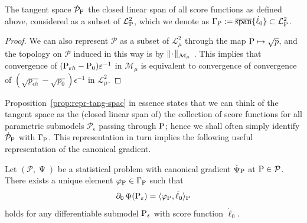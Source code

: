 \documentclass[a4,danish]{article}
\DeclareMathOperator{\TT}{\Psi}
\newcommand{\lp}{\mathcal{L}_{\P}^2} %
\begin{document}
\begin{proposition}
  \label{prop:repr-tang-spac}
  The tangent space $\dot{\mathcal{P}}_{\P}$  the closed linear span of all score functions as defined above, considered as a
  subset of $\lp$, which we denote as
  $\Gamma_{\P} := \overline{\mathrm{span}}\{\dot{\ell}_0\} \subset \lp$.
\end{proposition}

\begin{proof}
   We can also
  represent $\mathcal{P}$ as a subset of $\mathcal{L}_{\mu}^2$ through the map
  $\P \mapsto \sqrt{p}$, and the topology on $\mathcal{P}$ induced in this way is  by
  $\Vert \blank \Vert_{\mathcal{M}_{\mu}}$ \citep{bickel1993efficient}. This implies that
  convergence of $(\P_{\epsilon h} - \P_{0})\epsilon^{-1}$ in $\mathcal{M}_{\mu}$ is equivalent to
  convergence of convergence of $(\sqrt{p_{\epsilon h}} - \sqrt{p_{0}})\epsilon^{-1}$ in
  $\mathcal{L}_{\mu}^2$. 
\end{proof}

Proposition~\ref{prop:repr-tang-spac} in essence states that we can think of the tangent space as
the (closed linear span of) the collection of score functions for all parametric submodels
$\mathcal{P}_{\epsilon}$ passing through $\P$; hence we shall often simply identify
$\dot{\mathcal{P}}_{\P}$ with $\Gamma_{\P}$. This representation in turn implies the following
useful representation of the canonical gradient.

\begin{proposition}
  \label{prop:repr-can-gradient}
  Let $(\mathcal{P}, \TT)$ be a statistical problem with canonical gradient
  $\dot{\mathcal{\TT}}_{\P}$ at $\P \in \mathcal{P}$. There exists a unique element
  $\phi_{\P} \in \Gamma_{\P}$ such that
  \begin{equation}
    \label{eq:2}
    \partial_0 \TT(\P_{\epsilon})
    = \langle \phi_{\P}, \dot{\ell}_0 \rangle_{\P}
  \end{equation}
  holds for any differentiable submodel $\P_{\epsilon}$ with score function $\dot{\ell}_0$.
\end{proposition}
\end{document}
